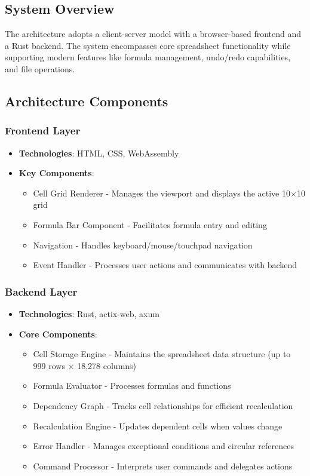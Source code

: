 \documentclass[10pt,a4paper]{article}  %
\begin{document}
\subsection{System Overview}

The architecture adopts a client-server model with a browser-based frontend and a Rust backend. The system encompasses core spreadsheet functionality while supporting modern features like formula management, undo/redo capabilities, and file operations.

\subsection{Architecture Components}

\subsubsection{Frontend Layer}
\begin{itemize}
    \item \textbf{Technologies}: HTML, CSS, WebAssembly

    \item \textbf{Key Components}:
    \begin{itemize}
        \item Cell Grid Renderer - Manages the viewport and displays the active 10$\times$10 grid
        \item Formula Bar Component - Facilitates formula entry and editing
        \item Navigation - Handles keyboard/mouse/touchpad navigation
        \item Event Handler - Processes user actions and communicates with backend
       
    \end{itemize}
\end{itemize}

\subsubsection{Backend Layer}
\begin{itemize}
    \item \textbf{Technologies}: Rust, actix-web, axum
    \item \textbf{Core Components}:
    \begin{itemize}
        \item Cell Storage Engine - Maintains the spreadsheet data structure (up to 999 rows $\times$ 18,278 columns)
        \item Formula Evaluator - Processes formulas and functions
        \item Dependency Graph - Tracks cell relationships for efficient recalculation
        \item Recalculation Engine - Updates dependent cells when values change
        \item Error Handler - Manages exceptional conditions and circular references
        \item Command Processor - Interprets user commands and delegates actions
    \end{itemize}
\end{itemize}
\end{document}
